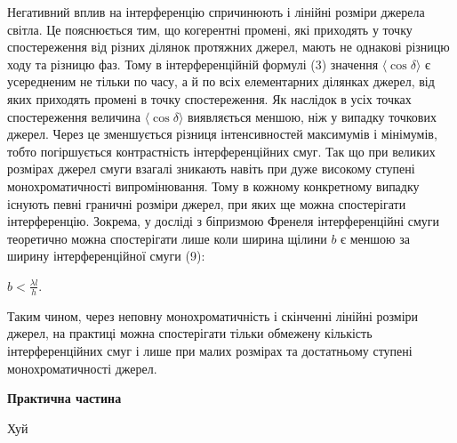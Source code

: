 \documentclass[12pt,a4paper]{article}
\begin{document}
    Негативний вплив на інтерференцію спричинюють і лінійні розміри
    джерела світла. Це пояснюється тим, що когерентні промені, які приходять у
    точку спостереження від різних ділянок протяжних джерел, мають не однакові різницю
    ходу та різницю фаз. Тому в інтерференційній формулі (3) значення
    $\langle \cos \delta \rangle$ є усередненим не тільки по часу, а й по всіх елементарних
    ділянках джерел, від яких приходять промені в точку спостереження.
    Як наслідок в усіх точках спостереження величина $\langle \cos \delta \rangle$ виявляється меншою, ніж
    у випадку точкових джерел. Через це зменшується різниця інтенсивностей
    максимумів і мінімумів, тобто погіршується контрастність інтерференційних
    смуг. Так що при великих розмірах джерел смуги взагалі зникають навіть при
    дуже високому ступені монохроматичності випромінювання. Тому в кожному конкретному
    випадку існують певні граничні розміри джерел, при яких ще можна спостерігати
    інтерференцію. Зокрема, у досліді з біпризмою Френеля інтерференційні смуги теоретично
    можна спостерігати лише коли ширина щілини $b$ є меншою за ширину інтерференційної смуги (9):

    \begin{center}
        $\displaystyle b < \frac{\lambda l}{h}$.
    \end{center}

    Таким чином, через неповну монохроматичність і скінченні лінійні
    розміри джерел, на практиці можна спостерігати тільки обмежену кількість
    інтерференційних смуг і лише при малих розмірах та достатньому ступені
    монохроматичності джерел.

    \newpage

    \begin{center}
        \textbf{\Large Практична частина}
    \end{center}

    Хуй
\end{document}
